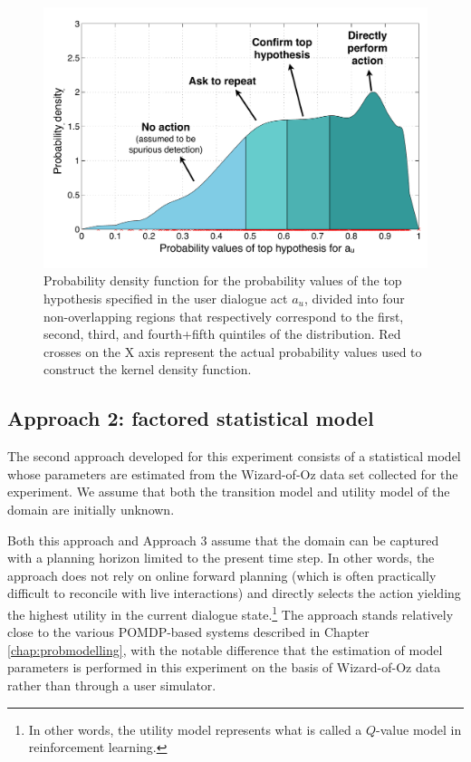 \begin{figure}[h!]
\centering
\includegraphics[scale=0.4]{imgs/asrconfidence.pdf} 
\caption{Probability density function for the probability values of the top hypothesis specified in the user dialogue act $a_u$, divided into four non-overlapping regions that respectively correspond to the first, second, third, and fourth+fifth quintiles of the distribution. Red crosses on the X axis represent the actual probability values used to construct the kernel density function. }
\label{fig:asrconfidence-exp3}
\end{figure}


\subsection{Approach 2: factored statistical model}
\label{sec:approach2}

The second approach developed for this experiment consists of a statistical model whose parameters are estimated from the Wizard-of-Oz data set collected for the experiment. We assume that both the transition model and utility model of the domain are initially unknown. 

Both this approach and Approach 3 assume that the domain can be captured with a planning horizon limited to the present time step.  In other words, the approach does not rely on online forward planning (which is often practically difficult to reconcile with live interactions) and directly selects the action yielding the highest utility in the current dialogue state.\footnote{In other words, the utility model represents what is called a $Q$-value model in reinforcement learning.} The approach stands relatively close to the various POMDP-based systems described in Chapter \ref{chap:probmodelling}, with the notable difference that the estimation of model parameters is performed in this experiment on the basis of Wizard-of-Oz data rather than through a user simulator. 

